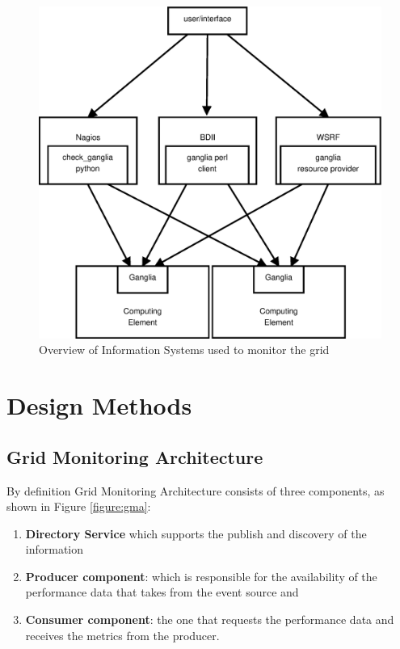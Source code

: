 \begin{figure}[htb]
\centering
 \includegraphics[width=130mm]{images/is.eps}
\caption{Overview of Information Systems used to monitor the grid}
\label{figure:is}
\end{figure}

\section{Design Methods}

\subsection{Grid Monitoring Architecture}

By definition \cite{Taylor2006} Grid Monitoring Architecture consists of three components, as shown in Figure \ref{figure:gma}:

\begin{enumerate}
\item {\bf Directory Service} which supports the publish and discovery of the information
\item {\bf Producer component}: which is responsible for the availability of the performance data that takes from the event source and
\item {\bf Consumer component}: the one that requests the performance data and receives the metrics from the producer.
\end{enumerate}

